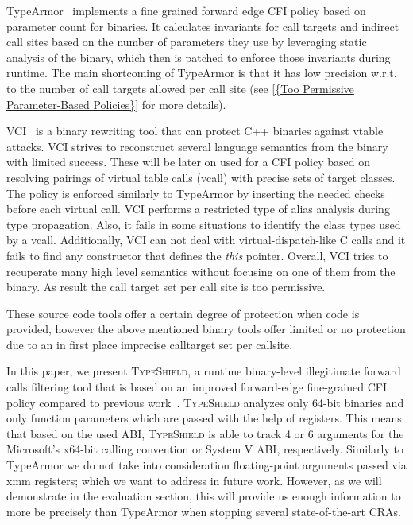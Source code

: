 TypeArmor~\cite{veen:typearmor} implements a fine grained forward edge CFI 
policy based on parameter count for binaries. It calculates invariants for call targets and indirect call sites based on
the number of parameters they use by leveraging static analysis of the binary, which then is
patched to enforce those invariants during runtime. 
The main shortcoming of TypeArmor is that it has low precision 
w.r.t. to the number of call targets allowed per call site 
(see \cref{{Too Permissive Parameter-Based Policies}} for more details).

VCI~\cite{vci:asiaccs} is a binary rewriting tool that can protect C++ binaries against 
vtable attacks. VCI strives to reconstruct several language semantics from the binary with limited success.
These will be later on used for a CFI policy based on resolving pairings of virtual table calls (vcall)
with precise sets of target classes. The policy is enforced similarly to TypeArmor by inserting the 
needed checks before each virtual call. VCI performs a restricted type of alias analysis during type propagation.
Also, it fails in some situations to identify the class types used by a vcall. Additionally, VCI can not deal with 
virtual-dispatch-like C calls and it fails to find any
constructor that defines the \textit{this} pointer. Overall, VCI tries to recuperate many high level 
semantics without focusing on one of them from the binary. As result the call target set per call site is too 
permissive.

These source code tools offer a certain degree of protection when code is provided, however 
the above mentioned binary tools offer limited or no protection due to an in first place
imprecise calltarget set per callsite.

In this paper, we present \textsc{TypeShield}, a runtime binary-level illegitimate forward calls 
filtering tool that is based on an improved forward-edge fine-grained CFI policy compared 
to previous work~\cite{veen:typearmor, crane:readactor++}.
\textsc{TypeShield} analyzes only 64-bit binaries and only function parameters 
which are passed with the help of registers. This means that based on the 
used ABI, \textsc{TypeShield} is able to track 4 or 6 arguments for the Microsoft's x64-bit calling convention
or System V ABI, respectively. Similarly to TypeArmor we do not take into consideration floating-point 
arguments passed via xmm registers; which we want to address in future work. However, as we will 
demonstrate in the evaluation section, this will provide us enough information to 
more be precisely than TypeArmor when stopping several state-of-the-art CRAs.

